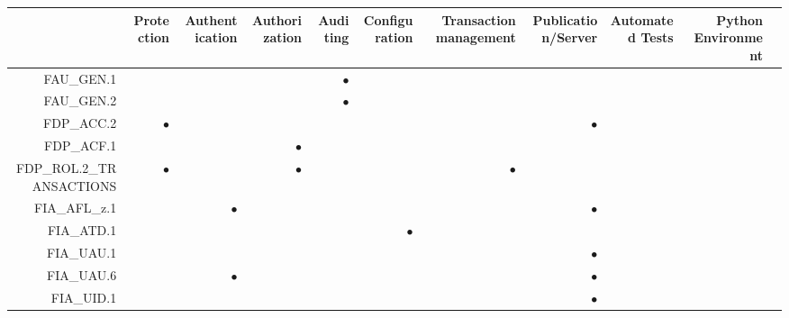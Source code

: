 \documentclass[12pt,english]{scrbook}
\newcommand{\oh}{$\bullet$}
\begin{document}
\begin{longtable}{r|R|R|R|R|R|R|R|R|R|R}
        \toprule
                    & Protection & Authentication & Authorization & Auditing & Configuration & Transaction management & Publication/Server & Automated Tests & Python Environment \\
        \midrule\endhead
FAU\_GEN.1          &            &                &               & \oh      &               &                        &                    &                 &                    \\   
FAU\_GEN.2          &            &                &               & \oh      &               &                        &                    &                 &                    \\   
FDP\_ACC.2          & \oh        &                &               &          &               &                        & \oh                &                 &                    \\   
FDP\_ACF.1          &            &                &  \oh          &          &               &                        &                    &                 &                    \\   
FDP\_ROL.2\_TRANSACTIONS
                    & \oh        &                &  \oh          &          &               & \oh                    &                    &                 &                    \\   
FIA\_AFL\_z.1       &            &  \oh           &               &          &               &                        & \oh                &                 &                    \\   
FIA\_ATD.1          &            &                &               &          & \oh           &                        &                    &                 &                    \\   
FIA\_UAU.1          &            &                &               &          &               &                        & \oh                &                 &                    \\   
FIA\_UAU.6          &            &  \oh           &               &          &               &                        & \oh                &                 &                    \\   
FIA\_UID.1          &            &                &               &          &               &                        & \oh                &                 &                    \\   

\end{longtable}
\end{document}
